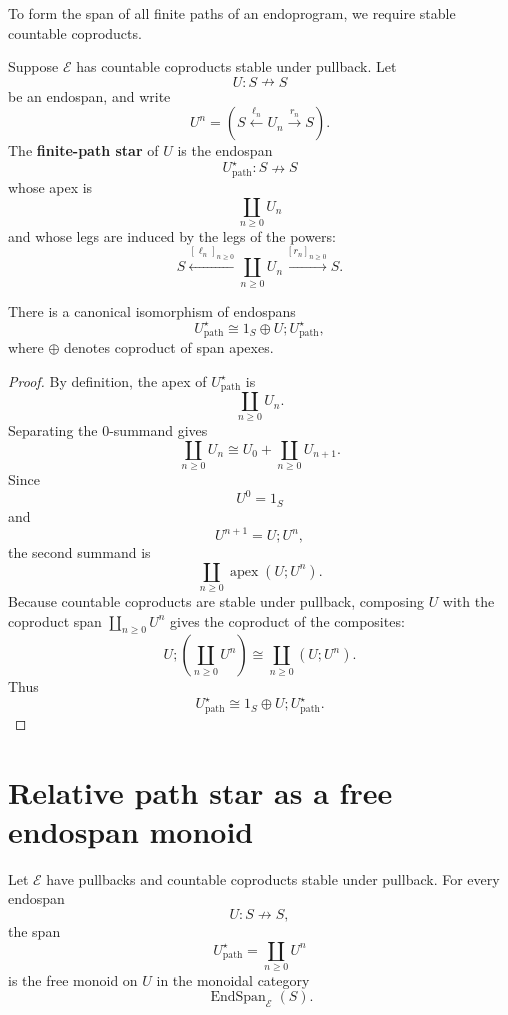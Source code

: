 To form the span of all finite paths of an endoprogram, we require stable
countable coproducts.

\begin{definition}
\label{def:relative-path-star}
Suppose \(\mathcal E\) has countable coproducts stable under pullback. Let
\[
U:S\nrightarrow S
\]
be an endospan, and write
\[
U^n=
(S\xleftarrow{\ell_n}U_n\xrightarrow{r_n}S).
\]
The \textbf{finite-path star} of \(U\) is the endospan
\[
U^\star_{\mathrm{path}}:S\nrightarrow S
\]
whose apex is
\[
\coprod_{n\ge0}U_n
\]
and whose legs are induced by the legs of the powers:
\[
S
\xleftarrow{[\ell_n]_{n\ge0}}
\coprod_{n\ge0}U_n
\xrightarrow{[r_n]_{n\ge0}}
S.
\]
\end{definition}

\begin{proposition}
\label{prop:relative-path-star-equation}
There is a canonical isomorphism of endospans
\[
U^\star_{\mathrm{path}}
\cong
1_S\oplus U;U^\star_{\mathrm{path}},
\]
where \(\oplus\) denotes coproduct of span apexes.
\end{proposition}

\begin{proof}
By definition, the apex of \(U^\star_{\mathrm{path}}\) is
\[
\coprod_{n\ge0}U_n.
\]
Separating the \(0\)-summand gives
\[
\coprod_{n\ge0}U_n
\cong
U_0+\coprod_{n\ge0}U_{n+1}.
\]
Since
\[
U^0=1_S
\]
and
\[
U^{n+1}=U;U^n,
\]
the second summand is
\[
\coprod_{n\ge0}\operatorname{apex}(U;U^n).
\]
Because countable coproducts are stable under pullback, composing \(U\) with
the coproduct span \(\coprod_{n\ge0}U^n\) gives the coproduct of the composites:
\[
U;\left(\coprod_{n\ge0}U^n\right)
\cong
\coprod_{n\ge0}(U;U^n).
\]
Thus
\[
U^\star_{\mathrm{path}}
\cong
1_S\oplus U;U^\star_{\mathrm{path}}.
\]
\end{proof}

\section{Relative path star as a free endospan monoid}
\label{sec:relative-path-star-free-monoid}

\begin{theorem}
\label{thm:relative-path-star-free-monoid}
Let \(\mathcal E\) have pullbacks and countable coproducts stable under
pullback. For every endospan
\[
U:S\nrightarrow S,
\]
the span
\[
U^\star_{\mathrm{path}}
=
\coprod_{n\ge0}U^n
\]
is the free monoid on \(U\) in the monoidal category
\[
\operatorname{EndSpan}_{\mathcal E}(S).
\]
\end{theorem}


